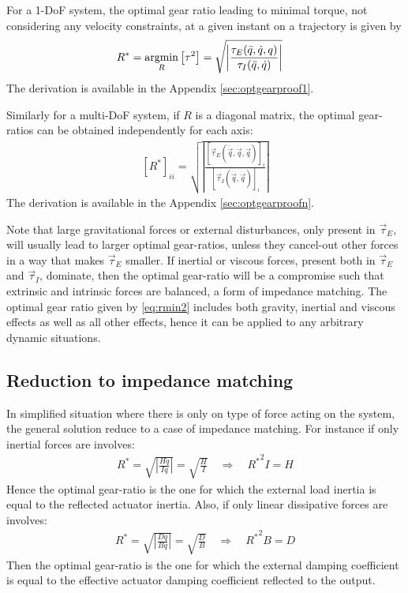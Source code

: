 For a 1-DoF system, the optimal gear ratio leading to minimal torque, not considering any velocity constraints, at a given instant on a trajectory is given by
%
\begin{align}
	R^{*} &= \operatornamewithlimits{argmin}\limits_{R} \left[ \tau^2 \right] = \sqrt{ \left | \frac{\tau_{E}(\ddot{q},\dot{q},q)}{\tau_{I}(\ddot{q},\dot{q})} \right |   } 
\label{eq:aaa}
\end{align}
%
The derivation is available in the Appendix \ref{sec:optgearproof1}.

Similarly for a multi-DoF system, if $R$ is a diagonal matrix, the optimal gear-ratios can be obtained independently for each axis:
%
\begin{align}
	[R^*]_{ii} = \sqrt{ \left | \frac{ [\vec{\tau}_{E}(\ddot{\vec{q}},\dot{\vec{q}},\vec{q})]_i }{ [\vec{\tau}_{I}(\ddot{\vec{q}},\dot{\vec{q}})]_i } \right | }
 \label{eq:rmin2}
\end{align}
%
The derivation is available in the Appendix \ref{sec:optgearproofn}.

Note that large gravitational forces or external disturbances, only present in $\vec{\tau}_{E}$, will usually lead to larger optimal gear-ratios, unless they cancel-out other forces in a way that makes $\vec{\tau}_{E}$ smaller. If inertial or viscous forces, present both in $\vec{\tau}_{E}$ and $\vec{\tau}_{I}$, dominate, then the optimal gear-ratio will be a compromise such that extrinsic and intrinsic forces are balanced, a form of impedance matching. The optimal gear ratio given by \eqref{eq:rmin2} includes both gravity, inertial and viscous effects as well as all other effects, hence it can be applied to any arbitrary dynamic situations.


\subsection{Reduction to impedance matching}
\label{sec:impreduc}

In simplified situation where there is only on type of force acting on the system, the general solution reduce to a case of impedance matching. For instance if only inertial forces are involves:
%
\begin{align}
	R^{*}  = \sqrt{ \left | \frac{H \ddot{q} }{ I \ddot{q} } \right |   } = \sqrt{ \frac{H}{I}}  \quad\Rightarrow\quad  {R^{*}}^2 I = H
 \label{eq:impmatchingHI}
\end{align}
%
Hence the optimal gear-ratio is the one for which the external load inertia is equal to the reflected actuator inertia. Also, if only linear dissipative forces are involves:
%
\begin{align}
	R^{*}  = \sqrt{ \left | \frac{D \dot{q} }{ B \dot{q} } \right |   } = \sqrt{ \frac{D}{B}}  \quad\Rightarrow\quad  {R^{*}}^2 B = D
 \label{eq:impmatchingDB}
\end{align}
%
Then the optimal gear-ratio is the one for which the external damping coefficient is equal to the effective actuator damping coefficient reflected to the output. 

